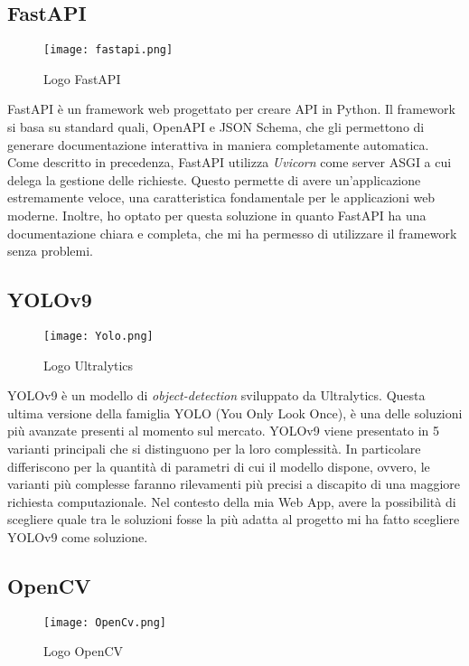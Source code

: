 \subsection{FastAPI}
\begin{wrapfigure}{r}{0.33\textwidth}
    \centering
    \texttt{[image: fastapi.png]}
    \caption{Logo FastAPI}
\end{wrapfigure}
    

FastAPI è un framework web progettato per creare API in Python. Il framework si basa su standard quali, OpenAPI e JSON Schema, che gli permettono di generare documentazione interattiva in maniera completamente automatica. Come descritto in precedenza, FastAPI utilizza \textit{Uvicorn} come server ASGI a cui delega la gestione delle richieste. Questo permette di avere un'applicazione estremamente veloce, una caratteristica fondamentale per le applicazioni web moderne. Inoltre, ho optato per questa soluzione in quanto FastAPI ha una documentazione chiara e completa, che mi ha permesso di utilizzare il framework senza problemi. 


\subsection{YOLOv9 }
\begin{wrapfigure}{r}{0.33\textwidth}
\centering
\vspace{-5px}
\texttt{[image: Yolo.png]}
\caption{Logo Ultralytics}
\end{wrapfigure}

YOLOv9 è un modello di \textit{object-detection} sviluppato da Ultralytics. Questa ultima versione della famiglia YOLO (You Only Look Once), è una delle soluzioni più avanzate presenti al momento sul mercato. YOLOv9 viene presentato in 5 varianti principali che si distinguono per la loro complessità. In particolare differiscono per la quantità di parametri di cui il modello dispone, ovvero, le varianti più complesse faranno rilevamenti più precisi a discapito di una maggiore richiesta computazionale. Nel contesto della mia Web App, avere la possibilità di scegliere quale tra le soluzioni fosse la più adatta al progetto mi ha fatto scegliere YOLOv9 come soluzione.

\subsection{OpenCV}
\begin{wrapfigure}{r}{0.33\textwidth}
\centering
\vspace{-10px}
\texttt{[image: OpenCv.png]}
\caption{Logo OpenCV}
\end{wrapfigure}

